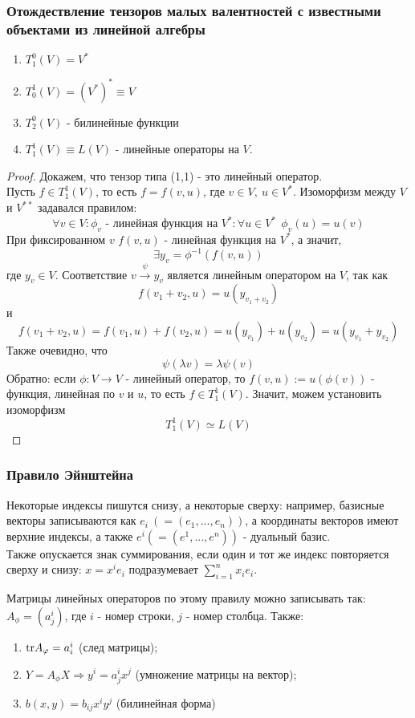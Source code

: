 \subsubsection*{Отождествление тензоров малых валентностей с известными объектами из линейной алгебры}
\begin{theorem}\tab
    \begin{enumerate}
        \item $T_1^0(V)=V^*$
        \item $T_0^1(V)=(V^*)^* \equiv V$
        \item $T_2^0(V)$ - билинейные функции
        \item $T_1^1(V) \equiv L(V)$ - линейные операторы на $V$.
    \end{enumerate}
\end{theorem} 
\begin{proof}
    Докажем, что тензор типа (1,1) - это линейный оператор.\\
    Пусть $f\in T_1^1(V)$, то есть $f=f(v,u)$, где $v\in V,\ u\in V^*$. Изоморфизм между $V$ и $V^{**}$ задавался правилом:
    \[ \forall v\in V: \phi_v \text{ - линейная функция на } V^*: \forall u\in V^*\ \ \phi_v(u)=u(v)\]
    При фиксированном $v$ $f(v,u)$ - линейная функция на $V^*$, а значит,
    \[\exists y_v = \phi^{-1}(f(v, u))\]
    где $y_v\in V$. Соответствие $v\xrightarrow{\psi} y_v$ является линейным оператором на $V$, так как 
    \[f(v_1+v_2,u)=u(y_{v_1+v_2})\]
    и 
    \[f(v_1+v_2,u)=f(v_1,u)+f(v_2,u)=u(y_{v_1})+u(y_{v_2})=u(y_{v_1}+y_{v_2})\]
    Также очевидно, что 
    \[\psi(\lambda v)=\lambda\psi(v)\]
    Обратно: если $\phi: V\to V$ - линейный оператор, то $f(v,u):=u(\phi(v))$ - функция, линейная по $v$ и $u$, то есть $f\in T^1_1(V)$. Значит, можем установить изоморфизм
    \[T_1^1(V)\simeq L(V)\]
\end{proof}  
\subsubsection*{Правило Эйнштейна}
Некоторые индексы пишутся снизу, а некоторые сверху: например, базисные векторы записываются как $e_i \ (= (e_1,...,e_n))$, а координаты векторов имеют верхние индексы, а также $e^i (=(e^1,...,e^n))$ - дуальный базис.\\
Также опускается знак суммирования, если один и тот же индекс повторяется сверху и снизу: $x = x^ie_i$ подразумевает $\sum \limits_{i=1}^n x_ie_i$.

Матрицы линейных операторов по этому правилу можно записывать так: $A_\phi = (a_j^i)$, где $i$ - номер строки, $j$ - номер столбца. Также:
\begin{enumerate}
    \item $\textup{tr} A_\phi = a_i^i$ (след матрицы);
    \item $Y = A_\phi X \Longrightarrow y^i = a_j^ix^j$ (умножение матрицы на вектор);
    \item $b(x, y) = b_{ij}x^iy^j$ (билинейная форма)
\end{enumerate}

